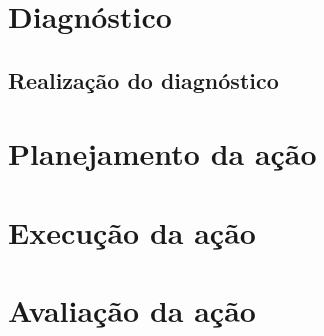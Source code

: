 \section{Diagnóstico}
	



	\subsection{Realização do diagnóstico}



\section{Planejamento da ação}
\section{Execução da ação}
\section{Avaliação da ação}